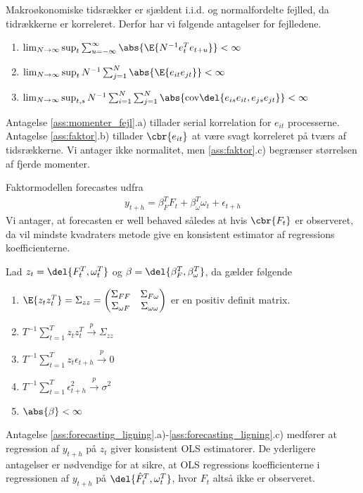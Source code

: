 Makroøkonomiske tidsrækker er sjældent i.i.d. og normalfordelte fejlled, da tidrækkerne er korreleret. 
Derfor har vi følgende antagelser for fejlledene.
%
\begin{ass} \label{ass:momenter_fejl}
\begin{enumerate}
\item \(\lim_{N \rightarrow \infty} \sup_t \sum_{u = - \infty}^\infty \abs{\E{N^{-1} e_t^T e_{t+u}}} < \infty\)
\item \(\lim_{N \rightarrow \infty} \sup_t N^{-1} \sum_{j = 1}^N \abs{\E{e_{it} e_{jt}}} < \infty\)
\item \(\lim_{N \rightarrow \infty} \sup_{t,s} N^{-1} \sum_{i=1}^N \sum_{j=1}^N \abs{\text{cov}\del{e_{is} e_{it}, e_{js} e_{jt}}} < \infty\)
\end{enumerate}
\end{ass}
%
Antagelse \ref{ass:momenter_fejl}.a) tillader serial korrelation for \(e_{it}\) processerne.
Antagelse \ref{ass:faktor}.b) tillader \(\cbr{e_{it}}\) at være svagt korreleret på tværs af tidsrækkerne.
Vi antager ikke normalitet, men \ref{ass:faktor}.c) begrænser størrelsen af fjerde momenter.

Faktormodellen forecastes udfra
\begin{align}
y_{t+h} = \beta_F^T F_t + \beta_\omega^T \omega_t + \epsilon_{t+h} \label{eq:forecast_ligning_faktor}
\end{align}
Vi antager, at forecasten er well behaved således at hvis \(\cbr{F_t}\) er observeret, da vil mindste kvadraters metode give en konsistent estimator af regressions koefficienterne.
%
\begin{ass} \label{ass:forecasting_ligning}
Lad \(z_t = \del{F_t^T, \omega_t^T}\) og \(\beta = \del{\beta_F^T, \beta_\omega^T}\), da gælder følgende
\begin{enumerate}
\item \(\E{z_t z_t^T} = \Sigma_{zz} = \begin{pmatrix}
\Sigma_{FF} & \Sigma_{F \omega} \\
\Sigma_{\omega F} & \Sigma_{\omega \omega}
\end{pmatrix} \) er en positiv definit matrix.
\item \(T^{-1} \sum_{t=1}^T z_t z_t^T \overset{p}{\rightarrow} \Sigma_{zz}\)
\item \(T^{-1} \sum_{t=1}^T z_t \epsilon_{t+h} \overset{p}{\rightarrow} 0\)
\item  \(T^{-1} \sum_{t=1}^T \epsilon_{t+h}^2 \overset{p}{\rightarrow} \sigma^2\)
\item \(\abs{\beta} < \infty\) 
\end{enumerate}
\end{ass}
%
Antagelse \ref{ass:forecasting_ligning}.a)-\ref{ass:forecasting_ligning}.c) medfører at regression af \(y_{t+h}\) på \(z_t\) giver konsistent OLS estimatorer.
De yderligere antagelser er nødvendige for at sikre, at OLS regressions koefficienterne i regressionen af \(y_{t+h}\) på \(\del{\hat{F}_t^T, \omega_t^T}\), hvor \(F_t\) altså ikke er observeret.


